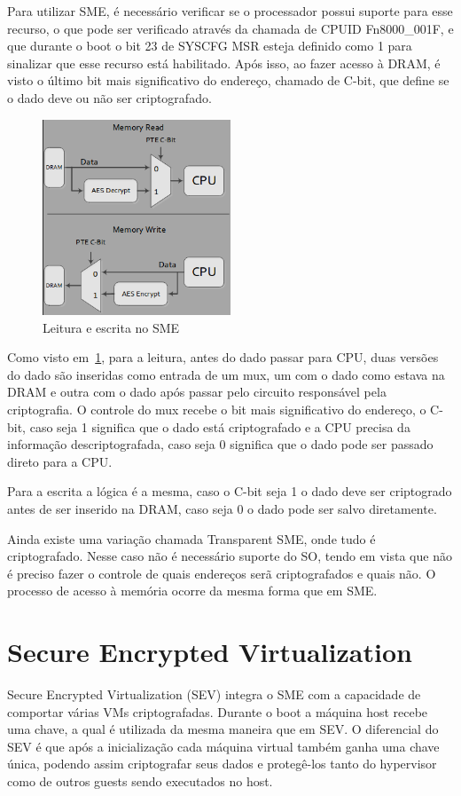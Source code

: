 \documentclass{report}
\begin{document}
Para utilizar SME, é necessário verificar se o processador possui suporte para
esse recurso, o que pode ser verificado através da chamada de CPUID
Fn8000\_001F, e que durante o boot o bit 23 de SYSCFG MSR esteja definido como
1 para sinalizar que esse recurso está habilitado. Após isso, ao fazer acesso à
DRAM, é visto o último bit mais significativo do endereço, chamado de C-bit,
que define se o dado deve ou não ser criptografado.

\begin{figure}[h]
    \centering
    \includegraphics[width=0.5\textwidth]{img/sme_read_write_architecture.png}
    \caption{Leitura e escrita no SME}\label{sme-read-write}
\end{figure}

Como visto em~\ref{sme-read-write}, para a leitura, antes do dado passar para
CPU, duas versões do dado são inseridas como entrada de um mux, um com o dado
como estava na DRAM e outra com o dado após passar pelo circuito responsável
pela criptografia. O controle do mux recebe o bit mais significativo do
endereço, o C-bit, caso seja 1 significa que o dado está criptografado e a CPU
precisa da informação descriptografada, caso seja 0 significa que o dado pode
ser passado direto para a CPU\@.

Para a escrita a lógica é a mesma, caso o C-bit seja 1 o dado deve ser
criptogrado antes de ser inserido na DRAM, caso seja 0 o dado pode ser salvo
diretamente.

Ainda existe uma variação chamada Transparent SME, onde tudo é criptografado.
Nesse caso não é necessário suporte do SO, tendo em vista que não é preciso
fazer o controle de quais endereços serã criptografados e quais não. O processo
de acesso à memória ocorre da mesma forma que em SME\@.


\section{Secure Encrypted Virtualization}
Secure Encrypted Virtualization (SEV) integra o SME com a capacidade de
comportar várias VMs criptografadas. Durante o boot a máquina host recebe uma
chave, a qual é utilizada da mesma maneira que em SEV. O diferencial do SEV é
que após a inicialização cada máquina virtual também ganha uma chave única,
podendo assim criptografar seus dados e protegê-los tanto do hypervisor como de
outros guests sendo executados no host.
\end{document}
